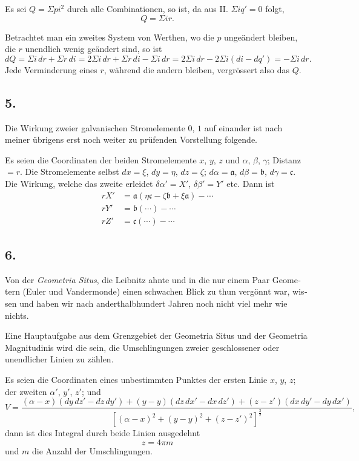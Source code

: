 \documentclass[fontsize=10pt,paper=a5,pagesize=auto]{scrbook}
\newcommand{\origpage}[1]{\marginpar{\footnotesize\textit{S. #1}}}
\begin{document}
Es sei $Q = \Sigma p i^2$ durch alle Combinationen, so ist, da aus II. $\Sigma i q' = 0$ folgt,
\[
Q = \Sigma i r.
\]

Betrachtet man ein zweites System von Werthen, wo die $p$ ungeändert bleiben, die $r$ unendlich wenig geändert sind, so ist
\[
dQ = \Sigma i \, dr + \Sigma r \, di = 2\Sigma i \, dr + \Sigma r \, di - \Sigma i \, dr = 2\Sigma i \, dr - 2\Sigma i(di - dq') = -\Sigma i \, dr.
\]
Jede Verminderung eines $r$, während die andern bleiben, vergrössert also das $Q$.

\subsection*{5.}
\origpage{605}
Die Wirkung zweier galvanischen Stromelemente $0$, $1$ auf einander ist nach meiner übrigens erst noch weiter zu prüfenden Vorstellung folgende.

Es seien die Coordinaten der beiden Stromelemente $x$, $y$, $z$ und $\alpha$, $\beta$, $\gamma$; Distanz $= r$. Die Stromelemente selbst $dx = \xi$, $dy = \eta$, $dz = \zeta$; $d\alpha = \mathfrak{a}$, $d\beta = \mathfrak{b}$, $d\gamma = \mathfrak{c}$. Die Wirkung, welche das zweite erleidet $\delta\alpha' = X'$, $\delta\beta' = Y'$ etc. Dann ist
\begin{align*}
r X' &= \mathfrak{a}(\eta\mathfrak{c} - \zeta\mathfrak{b} + \xi\mathfrak{a}) - \cdots\\
r Y' &= \mathfrak{b}(\cdots) - \cdots\\
r Z' &= \mathfrak{c}(\cdots) - \cdots
\end{align*}

\subsection*{6.}
\origpage{606}
\begin{otherlanguage}{ngerman}
Von der \textit{Geometria Situs}, die Leibnitz ahnte und in die nur einem Paar Geometern (Euler und Vandermonde) einen schwachen Blick zu thun vergönnt war, wissen und haben wir nach anderthalbhundert Jahren noch nicht viel mehr wie nichts.
\end{otherlanguage}

Eine Hauptaufgabe aus dem Grenzgebiet der Geometria Situs und der Geometria Magnitudinis wird die sein, die Umschlingungen zweier geschlossener oder unendlicher Linien zu zählen.

Es seien die Coordinaten eines unbestimmten Punktes der ersten Linie $x$, $y$, $z$; der zweiten $\alpha'$, $y'$, $z'$; und
\[
V = \frac{(\alpha - x)(dy \, dz' - dz \, dy') + (y - y)(dz \, dx' - dx \, dz') + (z - z')(dx \, dy' - dy \, dx')}{[(\alpha - x)^2 + (y - y)^2 + (z - z')^2]^{\frac{3}{2}}},
\]
dann ist dies Integral durch beide Linien ausgedehnt
\[
z = 4\pi m
\]
und $m$ die Anzahl der Umschlingungen.
\end{document}
